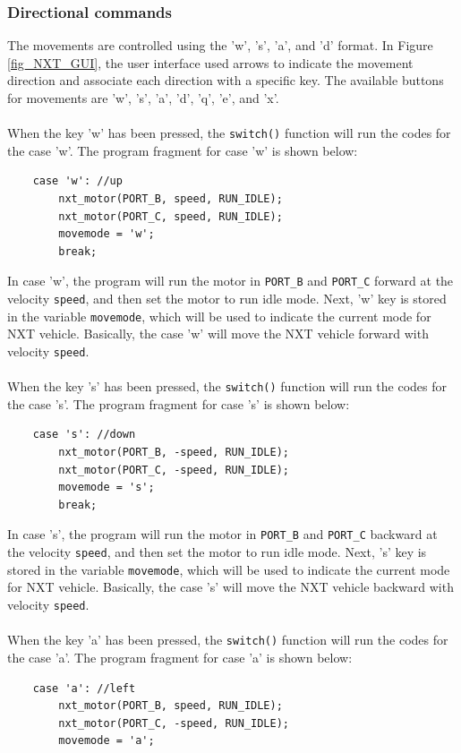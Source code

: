 \documentclass[12pt]{article}
\begin{document}
\subsubsection*{Directional commands}
The movements are controlled using the 'w', 's', 'a', and 'd' format. In Figure \ref{fig_NXT_GUI}, 
the user interface used arrows to indicate the movement direction and associate each direction with 
a specific key. The available buttons for movements are 'w', 's', 'a', 'd', 'q', 'e', and 'x'.
\\ \\
\noindent
When the key 'w' has been pressed, the \verb+switch()+ function will run the codes for the case 'w'.
The program fragment for case 'w' is shown below:
\begin{verbatim} 
    case 'w': //up
        nxt_motor(PORT_B, speed, RUN_IDLE);
        nxt_motor(PORT_C, speed, RUN_IDLE);
        movemode = 'w';
        break;
\end{verbatim}
In case 'w', the program will run the motor in \verb+PORT_B+ and \verb+PORT_C+ forward at the velocity 
\verb+speed+, and then set the motor to run idle mode. Next, 'w' key is stored in the variable 
\verb+movemode+, which will be used to indicate the current mode for NXT vehicle. Basically, the case 
'w' will move the NXT vehicle forward with velocity \verb+speed+.
\\ \\
\noindent
When the key 's' has been pressed, the \verb+switch()+ function will run the codes for the case 's'.
The program fragment for case 's' is shown below:
\begin{verbatim} 
    case 's': //down
        nxt_motor(PORT_B, -speed, RUN_IDLE);
        nxt_motor(PORT_C, -speed, RUN_IDLE);
        movemode = 's';
        break;
\end{verbatim}
In case 's', the program will run the motor in \verb+PORT_B+ and \verb+PORT_C+ backward at the velocity 
\verb+speed+, and then set the motor to run idle mode. Next, 's' key is stored in the variable \verb+movemode+, 
which will be used to indicate the current mode for NXT vehicle. Basically, the case 's' will move the NXT 
vehicle backward with velocity \verb+speed+.
\\ \\
\noindent 
When the key 'a' has been pressed, the \verb+switch()+ function will run the codes for the case 'a'.
The program fragment for case 'a' is shown below:
\begin{verbatim} 
    case 'a': //left
        nxt_motor(PORT_B, speed, RUN_IDLE);
        nxt_motor(PORT_C, -speed, RUN_IDLE);
        movemode = 'a';
\end{verbatim}
\end{document}
